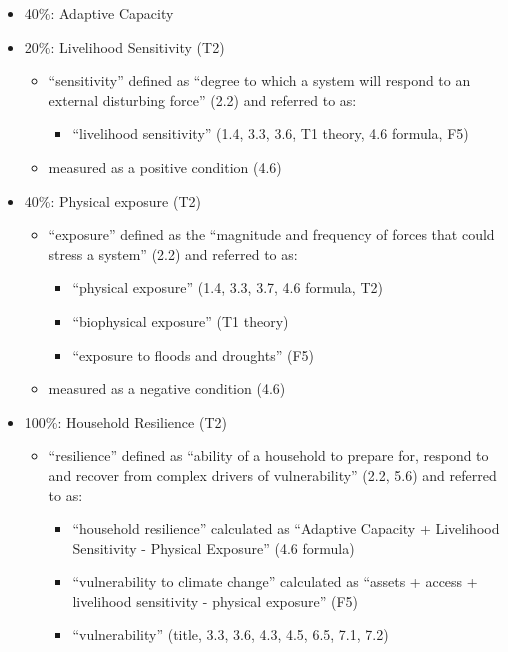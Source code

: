 \documentclass[
]{article}
\providecommand{\tightlist}{%
  \setlength{\itemsep}{0pt}\setlength{\parskip}{0pt}}
\begin{document}
\begin{itemize}
\tightlist
\item
  40\%: Adaptive Capacity
\item
  20\%: Livelihood Sensitivity (T2)

  \begin{itemize}
  \tightlist
  \item
    ``sensitivity'' defined as ``degree to which a system will respond
    to an external disturbing force'' (2.2) and referred to as:

    \begin{itemize}
    \tightlist
    \item
      ``livelihood sensitivity'' (1.4, 3.3, 3.6, T1 theory, 4.6 formula,
      F5)
    \end{itemize}
  \item
    measured as a positive condition (4.6)
  \end{itemize}
\item
  40\%: Physical exposure (T2)

  \begin{itemize}
  \tightlist
  \item
    ``exposure'' defined as the ``magnitude and frequency of forces that
    could stress a system'' (2.2) and referred to as:

    \begin{itemize}
    \tightlist
    \item
      ``physical exposure'' (1.4, 3.3, 3.7, 4.6 formula, T2)
    \item
      ``biophysical exposure'' (T1 theory)
    \item
      ``exposure to floods and droughts'' (F5)
    \end{itemize}
  \item
    measured as a negative condition (4.6)
  \end{itemize}
\item
  100\%: Household Resilience (T2)

  \begin{itemize}
  \tightlist
  \item
    ``resilience'' defined as ``ability of a household to prepare for,
    respond to and recover from complex drivers of vulnerability'' (2.2,
    5.6) and referred to as:

    \begin{itemize}
    \tightlist
    \item
      ``household resilience'' calculated as ``Adaptive Capacity +
      Livelihood Sensitivity - Physical Exposure'' (4.6 formula)
    \item
      ``vulnerability to climate change'' calculated as ``assets +
      access + livelihood sensitivity - physical exposure'' (F5)
    \item
      ``vulnerability'' (title, 3.3, 3.6, 4.3, 4.5, 6.5, 7.1, 7.2)
    \end{itemize}
  \end{itemize}
\end{itemize}
\end{document}
